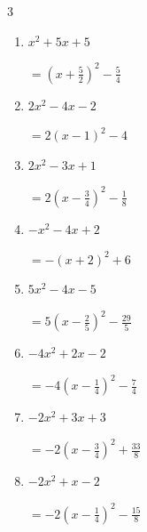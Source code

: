 \begin{multicols}{3}
\begin{enumerate}
        $\displaystyle =4\left( x+\frac{3}{8}\right)^{2}+\frac{71}{16}$

  \item $x^{2}+5x+5$

        $\displaystyle =\left( x+\frac{5}{2}\right)^{2}-\frac{5}{4}$

  \item $2x^{2}-4x-2$

        $\displaystyle =2\left( x-1\right)^{2}-4$

  \item $2x^{2}-3x+1$

        $\displaystyle =2\left( x-\frac{3}{4}\right)^{2}-\frac{1}{8}$

\columnbreak %

  \item $-x^{2}-4x+2$

        $\displaystyle =-\left( x+2\right)^{2}+6$

  \item $5x^{2}-4x-5$

        $\displaystyle =5\left( x-\frac{2}{5}\right)^{2}-\frac{29}{5}$

  \item $-4x^{2}+2x-2$

        $\displaystyle =-4\left( x-\frac{1}{4}\right)^{2}-\frac{7}{4}$

  \item $-2x^{2}+3x+3$

        $\displaystyle =-2\left( x-\frac{3}{4}\right)^{2}+\frac{33}{8}$

  \item $-2x^{2}+x-2$

        $\displaystyle =-2\left( x-\frac{1}{4}\right)^{2}-\frac{15}{8}$

\end{enumerate}
\end{multicols}
